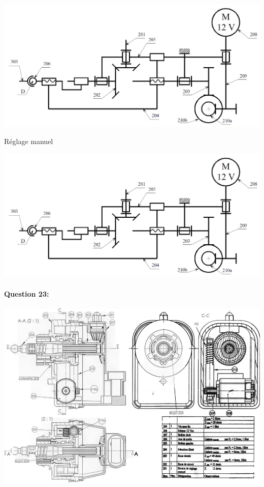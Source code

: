 \begin{center}
  \includegraphics[width=0.8\linewidth]{img/phare10}
\end{center}

Réglage manuel

\begin{center}
  \includegraphics[width=0.8\linewidth]{img/phare10}
\end{center}

\newpage

\paragraph{Question 23:}

\begin{center}
  \includegraphics[width=\linewidth]{img/rep13}
\end{center}

